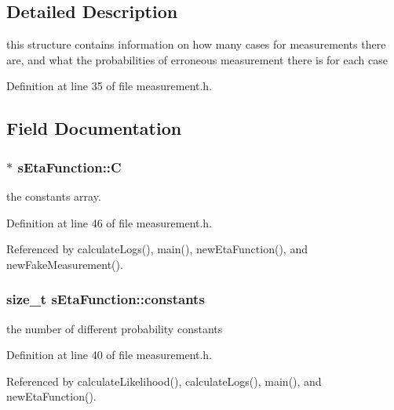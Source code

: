 \subsection{\-Detailed \-Description}
this structure contains information on how many cases for measurements there are, and what the probabilities of erroneous measurement there is for each case 

\-Definition at line 35 of file measurement.\-h.



\subsection{\-Field \-Documentation}
\hypertarget{structsEtaFunction_a05c2f93c1148d5268d359d78540c10be}{
\subsubsection[{\-C}]{$\ast$ {\bf s\-Eta\-Function\-::\-C}}}\label{structsEtaFunction_a05c2f93c1148d5268d359d78540c10be}


the constants array. 



\-Definition at line 46 of file measurement.\-h.



\-Referenced by calculate\-Logs(), main(), new\-Eta\-Function(), and new\-Fake\-Measurement().

\hypertarget{structsEtaFunction_a1fdf63f3a73e7fd663491e72421619f9}{
\subsubsection[{constants}]{\setlength{\rightskip}{0pt plus 5cm}size\-\_\-t {\bf s\-Eta\-Function\-::constants}}}\label{structsEtaFunction_a1fdf63f3a73e7fd663491e72421619f9}


the number of different probability constants 



\-Definition at line 40 of file measurement.\-h.



\-Referenced by calculate\-Likelihood(), calculate\-Logs(), main(), and new\-Eta\-Function().

